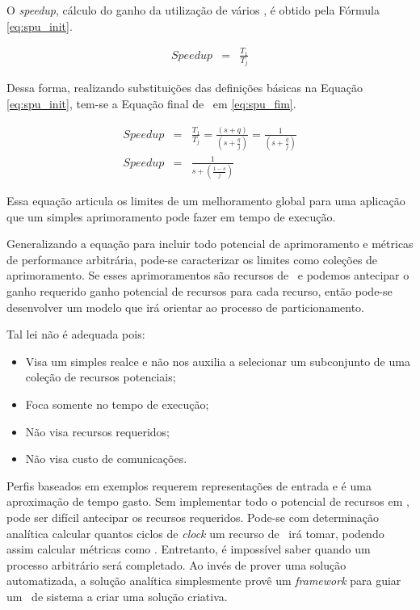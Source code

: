     O \textit{speedup}, cálculo do ganho da utilização de vários \cores, é obtido pela Fórmula \ref{eq:spu_init}.

	\begin{eqnarray}
		Speedup & = & \frac{T_1}{T_j} \label{eq:spu_init}
	\end{eqnarray}

	Dessa forma, realizando substituições das definições básicas na Equação \ref{eq:spu_init}, tem-se a Equação final de \speedup\ em \ref{eq:spu_fim}.

	\begin{eqnarray}
		Speedup & = & \frac{T_1}{T_j} = \frac{(s + q)}{\left(s+\frac{q}{j}\right)} = \frac{1}{\left(s+\frac{q}{j}\right)} \\
		Speedup & = & \frac{1}{s + \left(\frac{1 - s}{j}\right)} \label{eq:spu_fim}
	\end{eqnarray}

	Essa equação articula os limites de um melhoramento global para uma aplicação que um simples aprimoramento pode fazer em tempo de execução.

	Generalizando a equação para incluir todo potencial de aprimoramento e métricas de performance arbitrária, pode-se caracterizar os limites como coleções de aprimoramento.
    Se esses aprimoramentos são recursos de \hardware\ e podemos antecipar o ganho requerido ganho potencial de recursos para cada recurso, então pode-se desenvolver um modelo que irá orientar ao processo de particionamento.

    Tal lei não é adequada pois:
	\begin{itemize}
		\item Visa um simples realce e não nos auxilia a selecionar um subconjunto de uma coleção de recursos potenciais;
		\item Foca somente no tempo de execução;
		\item Não visa recursos requeridos;
		\item Não visa custo de comunicações.
	\end{itemize}

	Perfis baseados em exemplos requerem representações de entrada e é uma aproximação de tempo gasto. Sem implementar todo o potencial de recursos em \hardware, pode ser difícil antecipar os recursos requeridos. Pode-se com determinação analítica calcular quantos ciclos de \textit{clock} um recurso de \hardware\ irá tomar, podendo assim calcular métricas como \speedup. Entretanto, é impossível saber quando um processo arbitrário será completado. Ao invés de prover uma solução automatizada, a solução analítica simplesmente provê um \textit{framework} para guiar um \designer\ de sistema a criar uma solução criativa.

